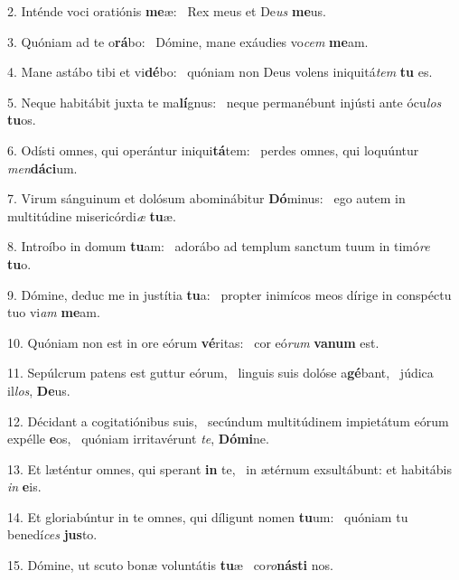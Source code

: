 2. Inténde voci oratiónis \textbf{me}æ: \ast\  Rex meus et De\textit{us} \textbf{me}us.\

3. Quóniam ad te o\textbf{rá}bo: \ast\  Dómine, mane exáudies vo\textit{cem} \textbf{me}am.\

4. Mane astábo tibi et vi\textbf{dé}bo: \ast\  quóniam non Deus volens iniquitá\textit{tem} \textbf{tu} es.\

5. Neque habitábit juxta te ma\textbf{lí}gnus: \ast\  neque permanébunt injústi ante ócu\textit{los} \textbf{tu}os.\

6. Odísti omnes, qui operántur iniqui\textbf{tá}tem: \ast\  perdes omnes, qui loquúntur \textit{men}\textbf{dá}\textbf{ci}um.\

7. Virum sánguinum et dolósum abominábitur \textbf{Dó}minus: \ast\  ego autem in multitúdine misericórdi\textit{æ} \textbf{tu}æ.\

8. Introíbo in domum \textbf{tu}am: \ast\  adorábo ad templum sanctum tuum in timó\textit{re} \textbf{tu}o.\

9. Dómine, deduc me in justítia \textbf{tu}a: \ast\  propter inimícos meos dírige in conspéctu tuo vi\textit{am} \textbf{me}am.\

10. Quóniam non est in ore eórum \textbf{vé}ritas: \ast\  cor eó\textit{rum} \textbf{va}\textbf{num} est.\

11. Sepúlcrum patens est guttur eórum, \dag\  linguis suis dolóse a\textbf{gé}bant, \ast\  júdica il\textit{los}, \textbf{De}us.\

12. Décidant a cogitatiónibus suis, \dag\  secúndum multitúdinem impietátum eórum expélle \textbf{e}os, \ast\  quóniam irritavérunt \textit{te}, \textbf{Dó}\textbf{mi}ne.\

13. Et læténtur omnes, qui sperant \textbf{in} te, \ast\  in ætérnum exsultábunt: et habitábis \textit{in} \textbf{e}is.\

14. Et gloriabúntur in te omnes, qui díligunt nomen \textbf{tu}um: \ast\  quóniam tu benedí\textit{ces} \textbf{jus}to.\

15. Dómine, ut scuto bonæ voluntátis \textbf{tu}æ \ast\  co\textit{ro}\textbf{nás}\textbf{ti} nos.\

